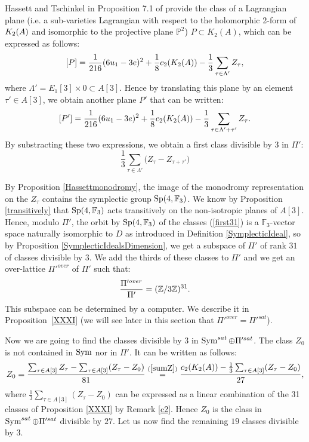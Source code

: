 Hassett and Tschinkel in Proposition 7.1 of \cite{Hassett} provide the class of a Lagrangian plane (i.e. a sub-varieties Lagrangian with respect to the holomorphic 2-form of $K_{ 2 }( A )$ and isomorphic to the projective plane $\mathbb{P}^2$) $P\subset K_2(A)$, which can be expressed as follows:
\begin{equation}
\left[P\right]=\frac{1}{216}(6u_1-3e)^2+\frac{1}{8}c_2(K_{ 2 }( A ))-\frac{1}{3}\sum_{\tau\in \Lambda'} Z_{\tau},
\label{LagrangianPlaneClass}
\end{equation}
where $\Lambda'=E_1[3]\times 0\subset A[3]$.
Hence by translating this plane by an element $\tau'\in A[3]$, we obtain another plane $P'$ that can be written:
$$\left[P'\right]=\frac{1}{216}(6u_1-3e)^2+\frac{1}{8}c_2(K_{ 2 }( A ))-\frac{1}{3}\sum_{\tau\in \Lambda'+\tau'} Z_{\tau}.$$
By substracting these two expressions, we obtain a first class divisible by 3 in $\Pi'$:
\begin{equation}
 \frac{1}{3}\sum_{\tau\in\Lambda'} \Big(Z_{\tau} - Z_{\tau+\tau'}\Big)
 \label{first31}
\end{equation}

By Proposition \ref{Hassettmonodromy}, the image of the monodromy representation on the $Z_\tau$ contains the symplectic group $\operatorname{Sp}(4,\mathbb F_3)$. 
We know by Proposition \ref{transitively} that $\operatorname{Sp}(4,\mathbb F_3)$ acts transitively on the non-isotropic planes of $A[3]$. Hence, modulo $\Pi'$, the orbit by $\operatorname{Sp}(4,\mathbb F_3)$ of the classes (\ref{first31}) is a $\mathbb F_3$-vector space naturally isomorphic to $D$ as introduced in Definition \ref{SymplecticIdeal}, so by Proposition \ref{SymplecticIdealsDimension}, we get a subspace of $\Pi'$ of rank $31$ of classes divisible by $3$.
We add the thirds of these classes to $\Pi'$ and we get an over-lattice $\Pi'^{over}$ of $\Pi'$ such that:
\begin{equation}
 \frac{\Pi'^{over}}{\Pi'}=(\mathbb{Z}/3\mathbb{Z})^{31}.
 \label{Piover}
\end{equation}
This subspace can be determined by a computer. We describe it in Proposition~\ref{XXXI} (we will see later in this section that $\Pi'^{over}=\Pi'^{sat}$).  

Now we are going to find the classes divisible by 3 in $\operatorname{Sym}^{sat}\oplus \Pi'^{sat}$.
The class $Z_0$ is not contained in $\operatorname{Sym}$ nor in $\Pi'$.
It can be written as follows:
$$
Z_0=\frac{\sum_{\tau\in A[3]}Z_\tau-\sum_{\tau\in A[3]}(Z_\tau-Z_0)}{81}
\stackrel{(\ref{sumZ})}{=} \frac{c_2(K_2(A))-\frac{1}{3}\sum_{\tau\in A[3]}(Z_\tau-Z_0)}{27},
$$
where $\frac{1}{3}\sum_{\tau\in A[3]}(Z_\tau-Z_0)$ can be expressed as a linear combination of the 31 classes of Proposition \ref{XXXI} by Remark \ref{c2}.
Hence $Z_0$ is the class in $\operatorname{Sym}^{sat}\oplus \Pi'^{sat}$ divisible by $27$. 
Let us now find the remaining $19$ classes divisible by $3$.


